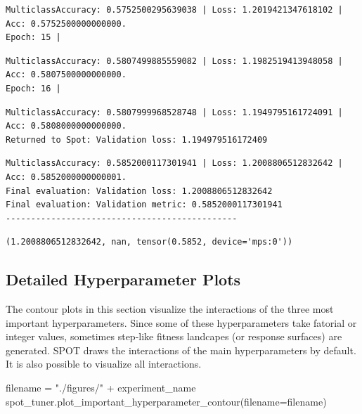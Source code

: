 \documentclass[
  letterpaper,
  DIV=11,
  numbers=noendperiod]{scrreprt}
\newenvironment{Shaded}{\begin{snugshade}}{\end{snugshade}}
\newcommand{\NormalTok}[1]{\textcolor[rgb]{0.00,0.23,0.31}{#1}}
\newcommand{\OperatorTok}[1]{\textcolor[rgb]{0.37,0.37,0.37}{#1}}
\newcommand{\StringTok}[1]{\textcolor[rgb]{0.13,0.47,0.30}{#1}}
\begin{document}
\begin{verbatim}
MulticlassAccuracy: 0.5752500295639038 | Loss: 1.2019421347618102 | Acc: 0.5752500000000000.
Epoch: 15 | 
\end{verbatim}

\begin{verbatim}
MulticlassAccuracy: 0.5807499885559082 | Loss: 1.1982519413948058 | Acc: 0.5807500000000000.
Epoch: 16 | 
\end{verbatim}

\begin{verbatim}
MulticlassAccuracy: 0.5807999968528748 | Loss: 1.1949795161724091 | Acc: 0.5808000000000000.
Returned to Spot: Validation loss: 1.194979516172409
\end{verbatim}

\begin{verbatim}
MulticlassAccuracy: 0.5852000117301941 | Loss: 1.2008806512832642 | Acc: 0.5852000000000001.
Final evaluation: Validation loss: 1.2008806512832642
Final evaluation: Validation metric: 0.5852000117301941
----------------------------------------------
\end{verbatim}

\begin{verbatim}
(1.2008806512832642, nan, tensor(0.5852, device='mps:0'))
\end{verbatim}

\hypertarget{detailed-hyperparameter-plots-2}{%
\subsection{Detailed Hyperparameter
Plots}\label{detailed-hyperparameter-plots-2}}

The contour plots in this section visualize the interactions of the
three most important hyperparameters. Since some of these
hyperparameters take fatorial or integer values, sometimes step-like
fitness landcapes (or response surfaces) are generated. SPOT draws the
interactions of the main hyperparameters by default. It is also possible
to visualize all interactions.

\begin{Shaded}
\begin{Highlighting}[]
\NormalTok{filename }\OperatorTok{=} \StringTok{"./figures/"} \OperatorTok{+}\NormalTok{ experiment\_name}
\NormalTok{spot\_tuner.plot\_important\_hyperparameter\_contour(filename}\OperatorTok{=}\NormalTok{filename)}
\end{Highlighting}
\end{Shaded}
\end{document}
